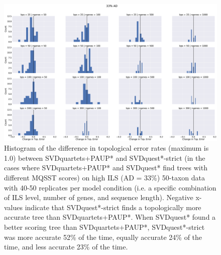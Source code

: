 \begin{figure}
\includegraphics[width=\textwidth]{svdquest-figs/differentscore-rfdists-hist-cgenes-33.eps}
\caption[Histogram of differences in topological error between SVDquartets+PAUP* and SVDquest*-strict for the high ILS 50-taxon datasets]{Histogram of the difference in topological error rates (maximum is 1.0) between
  SVDquartets+PAUP* and SVDquest*-strict (in the cases where SVDquartets+PAUP* and SVDquest* find trees
  with different MQSST scores)  on high ILS (AD = 33\%) 50-taxon data with
  40-50 replicates per model condition (i.e. a specific combination of ILS level, number of genes, and sequence length). 
  Negative x-values indicate
  that SVDquest*-strict finds a topologically more accurate tree than SVDquartets+PAUP*.
  When SVDquest* found a better scoring tree than SVDquartets+PAUP*, SVDquest*-strict was more
accurate   52\% of the time, equally accurate 24\% of the time, and
less accurate 23\% of the time.
}
\label{fig:s5}
\end{figure}




\clearpage

